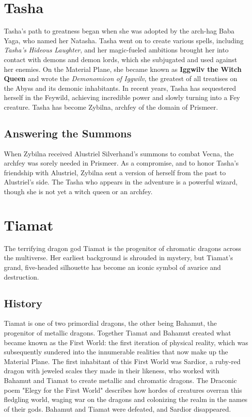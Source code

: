 \documentclass[10pt,a4paper,twoside,bg=print,twocolumn,openany,nodeprecatedcode]{dndbook}
\begin{document}
\section{Tasha}
Tasha's path to greatness began when she was adopted by the arch-hag Baba Yaga, who named her Natasha. Tasha went on to create various spells, including \textit{Tasha's Hideous Laughter}, and her magic-fueled ambitions brought her into contact with demons and demon lords, which she subjugated and used against her enemies. On the Material Plane, she became known as \textbf{Iggwilv the Witch Queen} and wrote the \textit{Demonomicon of Iggwilv}, the greatest of all treatises on the Abyss and its demonic inhabitants. In recent years, Tasha has sequestered herself in the Feywild, achieving incredible power and slowly turning into a Fey creature. Tasha has become Zybilna, archfey of the domain of Prismeer.

\subsection{Answering the Summons}
When Zybilna received Alustriel Silverhand's summons to combat Vecna, the archfey was sorely needed in Prismeer. As a compromise, and to honor Tasha's friendship with Alustriel, Zybilna sent a version of herself from the past to Alustriel's side. The Tasha who appears in the adventure is a powerful wizard, though she is not yet a witch queen or an archfey.

\section{Tiamat}
The terrifying dragon god Tiamat is the progenitor of chromatic dragons across the multiverse. Her earliest background is shrouded in mystery, but Tiamat's grand, five-headed silhouette has become an iconic symbol of avarice and destruction.

\subsection{History}
Tiamat is one of two primordial dragons, the other being Bahamut, the progenitor of metallic dragons. Together Tiamat and Bahamut created what became known as the First World: the first iteration of physical reality, which was subsequently sundered into the innumerable realities that now make up the Material Plane. The first inhabitant of this First World was Sardior, a ruby-red dragon with jeweled scales they made in their likeness, who worked with Bahamut and Tiamat to create metallic and chromatic dragons. The Draconic poem "Elegy for the First World" describes how hordes of creatures overran this fledgling world, waging war on the dragons and colonizing the realm in the names of their gods. Bahamut and Tiamat were defeated, and Sardior disappeared.
\end{document}
